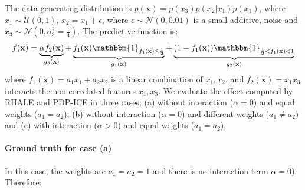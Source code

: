 \documentclass{article} %
\newcommand{\xb}{\mathbf{x}}
\begin{document}
The data generating distribution is
\(p(\mathbf{x}) = p(x_3)p(x_2|x_1)p(x_1)\), where
\(x_1 \sim \mathcal{U}(0,1)\), \(x_2 = x_1 + \epsilon \), where $\epsilon \sim \mathcal{N}(0, 0.01)$ is a small additive, noise and
\(x_3 \sim \mathcal{N}(0, \sigma_3^2 = \frac{1}{4})\). The predictive function is:
%
\begin{equation}
  \label{eq:synth-ex-1-function-app}
  f(\mathbf{x}) = \underbrace{\alpha f_2(\xb)}_{g_3(\xb)} + \underbrace{f_1(\xb) \mathbbm{1}_{f_1(\xb) \leq \frac{1}{2}}}_{g_1(\xb)} + \underbrace{(1 - f_1(\xb)) \mathbbm{1}_{\frac{1}{2} < f_1(\xb) < 1}}_{g_2(\xb)}
\end{equation}
%
where \(f_1(\mathbf{x}) = a_1 x_1 + a_2 x_2\) is a linear combination of $x_1, x_2$, and
\(f_2(\mathbf{x}) = x_1 x_3\) interacts the non-correlated features $x_1, x_3$.
We evaluate the effect computed by RHALE and PDP-ICE in three cases; (a)
without interaction (\(\alpha=0\)) and equal weights (\(a_1=a_2\)),
(b) without interaction (\(\alpha=0\)) and different weights
(\( a_1 \neq a_2 \)) and (c) with interaction (\(\alpha > 0\)) and
equal weights (\(a_1=a_2\)).

\paragraph{Ground truth for case (a)}

In this case, the weights are $a_1 = a_2 = 1$ and there is no interaction term $\alpha=0$).
Therefore:
\end{document}
